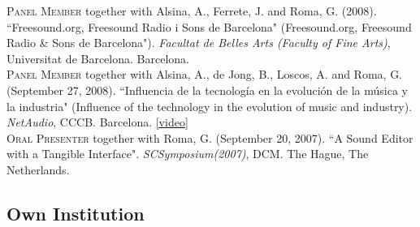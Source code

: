 \documentclass[10pt, a4paper]{article}
\newcommand{\years}[1]{\marginnote{\scriptsize #1}}
\begin{document}
\years{2008b} \textsc{Panel Member} together with Alsina, A., Ferrete, J. and Roma, G. (2008). “Freesound.org, Freesound Radio i Sons de Barcelona" (Freesound.org, Freesound Radio \& Sons de Barcelona"). \emph{Facultat de Belles Arts (Faculty of Fine Arts)}, Universitat de Barcelona. Barcelona.\\
\years{2008a} \textsc{Panel Member} together with Alsina, A., de Jong, B., Loscos, A. and Roma, G. (September 27, 2008). “Influencia de la tecnología en la evolución de la música y la industria" (Influence of the technology in the evolution of music and industry). \emph{NetAudio}, CCCB. Barcelona. \href{https://www.youtube.com/watch?v=6JlCCvYXrHY}{[video]}\\
\years{2007}\textsc{Oral Presenter} together with Roma, G. (September 20, 2007). “A Sound Editor with a Tangible Interface". \emph{SCSymposium(2007)}, DCM. The Hague, The Netherlands.

\subsection*{Own Institution}
\noindent
\end{document}
